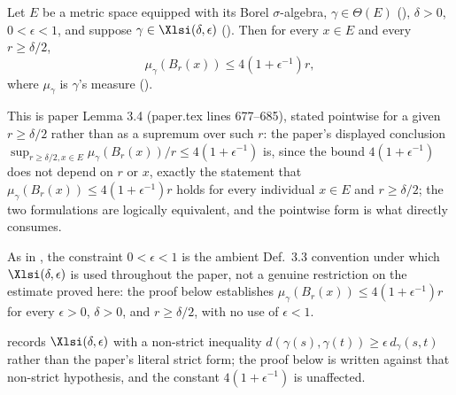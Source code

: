 \begin{lemma}
  \label{large-ball-lem}
  Let $E$ be a metric space equipped with its Borel $\sigma$-algebra, $\gamma \in \Theta(E)$
  (), $\delta > 0$, $0 < \epsilon < 1$, and suppose $\gamma \in
  \Xlsi(\delta,\epsilon)$ (). Then for every $x \in E$ and every $r \geq \delta/2$,
  \[
    \mu_\gamma(B_r(x)) \leq 4(1+\epsilon^{-1}) r
    ,
  \]
  where $\mu_\gamma$ is $\gamma$'s measure ().

  This is paper Lemma 3.4 (paper.tex lines 677--685), stated pointwise for a given $r \geq
  \delta/2$ rather than as a supremum over such $r$: the paper's displayed conclusion
  $\sup_{r\geq\delta/2,x\in E} \mu_\gamma(B_r(x))/r \leq 4(1+\epsilon^{-1})$ is, since the bound
  $4(1+\epsilon^{-1})$ does not depend on $r$ or $x$, exactly the statement that
  $\mu_\gamma(B_r(x)) \leq 4(1+\epsilon^{-1})r$ holds for every individual $x \in E$ and $r \geq
  \delta/2$; the two formulations are logically equivalent, and the pointwise form is what
   directly consumes.

  As in , the constraint $0 < \epsilon < 1$ is the ambient Def.~3.3 convention under
  which $\Xlsi(\delta,\epsilon)$ is used throughout the paper, not a genuine restriction on the
  estimate proved here: the proof below establishes $\mu_\gamma(B_r(x)) \leq 4(1+\epsilon^{-1})r$
  for every $\epsilon > 0$, $\delta > 0$, and $r \geq \delta/2$, with no use of $\epsilon < 1$.

   records $\Xlsi(\delta,\epsilon)$ with a non-strict inequality
  $d(\gamma(s),\gamma(t)) \geq \epsilon\, d_\gamma(s,t)$ rather than the paper's literal strict
  form; the proof below is written against that non-strict hypothesis, and the constant
  $4(1+\epsilon^{-1})$ is unaffected.
\end{lemma}
